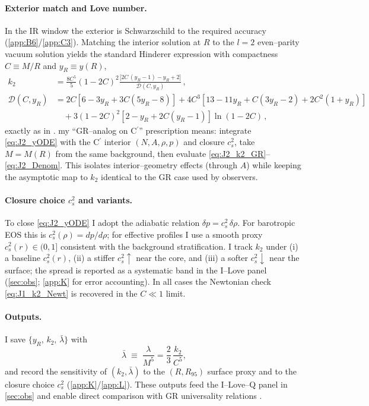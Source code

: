 \documentclass{iopjournal}
\begin{document}
\paragraph{Exterior match and Love number.}
In the IR window the exterior is Schwarzschild to the required accuracy (\cref{app:B6}/\cref{app:C3}). Matching the interior solution at $R$ to the $l=2$ even–parity vacuum solution yields the standard Hinderer expression with compactness $C\equiv M/R$ and $y_R\equiv y(R)$,
\begin{align}
k_2 &= \frac{8C^5}{5}(1-2C)^2
\frac{ \big[2C\,(y_R-1)-y_R+2\big]}
{ \mathcal D(C,y_R)}\,, \label{eq:J2_k2_GR}\\[2pt]
\mathcal D(C,y_R)&=
2C\!\left[6-3y_R+3C(5y_R-8)\right]
+4C^3\!\left[13-11y_R+C(3y_R-2)+2C^2(1+y_R)\right]
\nonumber\\
&\quad
+3(1-2C)^2\!\left[2-y_R+2C(y_R-1)\right]\ln(1-2C)\,,
\label{eq:J2_Denom}
\end{align}
exactly as in \cite{Hinderer2008,BinningtonPoisson2009,DamourNagar2009}. my ``GR–analog on C$^\prime$'' prescription means: integrate \eqref{eq:J2_yODE} with the C$^\prime$ interior $(N,A,\rho,p)$ and closure $c_s^2$, take $M= M(R)$ from the same background, then evaluate \eqref{eq:J2_k2_GR}–\eqref{eq:J2_Denom}. This isolates interior–geometry effects (through $A$) while keeping the asymptotic map to $k_2$ identical to the GR case used by observers.

\paragraph{Closure choice $c_s^2$ and variants.}
To close \eqref{eq:J2_yODE} I adopt the adiabatic relation $\delta p = c_s^2\,\delta\rho$. For barotropic EOS this is $c_s^2(\rho)=dp/d\rho$; for effective profiles I use a smooth proxy $c_s^2(r)\in(0,1]$ consistent with the background stratification. I track $k_2$ under (i) a baseline $c_s^2(r)$, (ii) a stiffer $c_s^2\uparrow$ near the core, and (iii) a softer $c_s^2\downarrow$ near the surface; the spread is reported as a systematic band in the I–Love panel (\cref{sec:obs}; \cref{app:K} for error accounting). In all cases the Newtonian check \eqref{eq:J1_k2_Newt} is recovered in the $C\!\ll\!1$ limit.

\paragraph{Outputs.}
I save $\{y_R,\,k_2,\,\bar\lambda\}$ with
\begin{equation}
\bar\lambda\;\equiv\;\frac{\lambda}{M^{5}}
=\frac{2}{3}\,\frac{k_2}{C^{5}},
\label{eq:J2_lambdabar}
\end{equation}
and record the sensitivity of $(k_2,\bar\lambda)$ to the $(R,R_{95})$ surface proxy and to the closure choice $c_s^2$ (\cref{app:K}/\cref{app:L}). These outputs feed the I–Love–Q panel in \cref{sec:obs} and enable direct comparison with GR universality relations \cite{Hinderer2008,DamourNagar2009,PoissonWill2014}.
\end{document}

